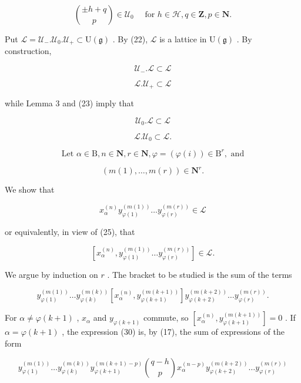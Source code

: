\[
\binom{\pm h + q}{p} \in \mathcal {U} _ {0} \quad \text { for } h \in \mathcal {H}, q \in \mathbf {Z}, p \in \mathbf {N}.\tag{23}
\]

Put \(\mathcal{L} = \mathcal{U}_{-}. \mathcal{U}_{0}. \mathcal{U}_{+} \subset \mathrm{U}(\mathfrak{g})\) . By (22), \(\mathcal{L}\) is a lattice in \(\mathrm{U}(\mathfrak{g})\) . By construction,

\[
\mathcal {U} _ {-}. \mathcal {L} \subset \mathcal {L}\tag{24}
\]

\[
\mathcal {L}. \mathcal {U} _ {+} \subset \mathcal {L}\tag{25}
\]

while Lemma 3 and (23) imply that

\[
\mathcal {U} _ {0}. \mathcal {L} \subset \mathcal {L}\tag{26}
\]

\[
\mathcal {L}. \mathcal {U} _ {0} \subset \mathcal {L}.\tag{27}
\]

\[
\text {   Let   } \alpha \in \mathrm{B}, n \in \mathbf {N}, r \in \mathbf {N}, \varphi = (\varphi (i)) \in \mathrm{B} ^ {r}, \text {   and   }
\]

\[
(m (1), \dots , m (r)) \in \mathbf {N} ^ {r}.
\]

We show that

\[
x _ {\alpha} ^ {(n)} y _ {\varphi (1)} ^ {(m (1))} \dots y _ {\varphi (r)} ^ {(m (r))} \in \mathcal {L}\tag{28}
\]

or equivalently, in view of (25), that

\[
[ x _ {\alpha} ^ {(n)}, y _ {\varphi (1)} ^ {(m (1))} \dots y _ {\varphi (r)} ^ {(m (r))} ] \in \mathcal {L}.\tag{29}
\]

We argue by induction on \(r\) . The bracket to be studied is the sum of the terms

\[
y _ {\varphi (1)} ^ {(m (1))} \dots y _ {\varphi (k)} ^ {(m (k))} [ x _ {\alpha} ^ {(n)}, y _ {\varphi (k + 1)} ^ {(m (k + 1))} ] y _ {\varphi (k + 2)} ^ {(m (k + 2))} \dots y _ {\varphi (r)} ^ {(m (r))}.\tag{30}
\]

For \(\alpha \neq \varphi (k + 1)\) , \(x_{\alpha}\) and \(y_{\varphi (k + 1)}\) commute, so \([x_{\alpha}^{(n)},y_{\varphi (k + 1)}^{(m(k + 1))}] = 0\) . If \(\alpha = \varphi (k + 1)\) , the expression (30) is, by (17), the sum of expressions of the form

\[
y _ {\varphi (1)} ^ {(m (1))} \dots y _ {\varphi (k)} ^ {(m (k))} y _ {\varphi (k + 1)} ^ {(m (k + 1) - p)} \binom{q - h}{p} x _ {\alpha} ^ {(n - p)} y _ {\varphi (k + 2)} ^ {(m (k + 2))} \dots y _ {\varphi (r)} ^ {(m (r))}\tag{31}
\]

